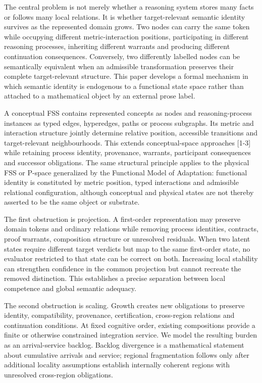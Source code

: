 The central problem is not merely whether a reasoning system stores many
facts or follows many local relations. It is whether target-relevant
semantic identity survives as the represented domain grows. Two nodes
can carry the same token while occupying different metric-interaction
positions, participating in different reasoning processes, inheriting
different warrants and producing different continuation consequences.
Conversely, two differently labelled nodes can be semantically
equivalent when an admissible transformation preserves their complete
target-relevant structure. This paper develops a formal mechanism in
which semantic identity is endogenous to a functional state space rather
than attached to a mathematical object by an external prose label.

A conceptual FSS contains represented concepts as nodes and
reasoning-process instances as typed edges, hyperedges, paths or process
subgraphs. Its metric and interaction structure jointly determine
relative position, accessible transitions and target-relevant
neighbourhoods. This extends conceptual-space approaches {[}1-3{]} while
retaining process identity, provenance, warrants, participant
consequences and successor obligations. The same structural principle
applies to the physical FSS or P-space generalized by the Functional
Model of Adaptation: functional identity is constituted by metric
position, typed interactions and admissible relational configuration,
although conceptual and physical states are not thereby asserted to be
the same object or substrate.

The first obstruction is projection. A first-order representation may
preserve domain tokens and ordinary relations while removing process
identities, contracts, proof warrants, composition structure or
unresolved residuals. When two latent states require different target
verdicts but map to the same first-order state, no evaluator restricted
to that state can be correct on both. Increasing local stability can
strengthen confidence in the common projection but cannot recreate the
removed distinction. This establishes a precise separation between local
competence and global semantic adequacy.

The second obstruction is scaling. Growth creates new obligations to
preserve identity, compatibility, provenance, certification,
cross-region relations and continuation conditions. At fixed cognitive
order, existing compositions provide a finite or otherwise constrained
integration service. We model the resulting burden as an arrival-service
backlog. Backlog divergence is a mathematical statement about cumulative
arrivals and service; regional fragmentation follows only after
additional locality assumptions establish internally coherent regions
with unresolved cross-region obligations.

